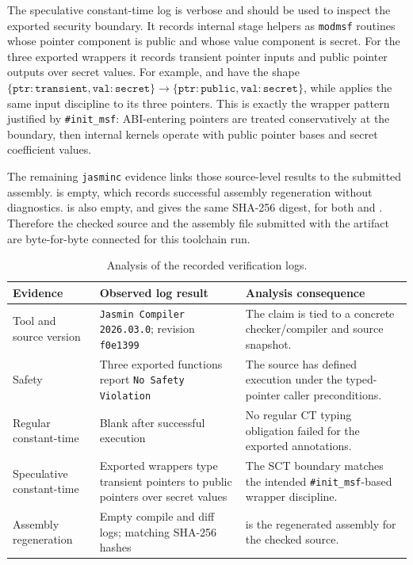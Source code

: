 \documentclass[10pt,twocolumn]{article}
\newcommand{\ct}{constant-time}
\begin{document}
The speculative \ct{} log is verbose and should be used to inspect the exported
security boundary.  It records internal stage helpers as \texttt{modmsf}
routines whose pointer component is public and whose value component is secret.
For the three exported wrappers it records transient pointer inputs and public
pointer outputs over secret values.  For example,  and
 have the shape
\(\{\texttt{ptr}:\texttt{transient},\texttt{val}:\texttt{secret}\}\to
\{\texttt{ptr}:\texttt{public},\texttt{val}:\texttt{secret}\}\), while
 applies the same input discipline to its three
pointers.  This is exactly the wrapper pattern justified by
\texttt{\#init\_msf}: ABI-entering pointers are treated conservatively at the
boundary, then internal kernels operate with public pointer bases and secret
coefficient values.

The remaining \texttt{jasminc} evidence links those source-level results to the
submitted assembly.   is empty, which records
successful assembly regeneration without diagnostics.  
is also empty, and  gives the same SHA-256 digest,
for both  and .  Therefore the checked
source and the assembly file submitted with the artifact are byte-for-byte
connected for this toolchain run.

\begin{table}[t]
\centering
\scriptsize
\setlength{\tabcolsep}{3pt}
\begin{tabular}{P{0.25\columnwidth}P{0.30\columnwidth}P{0.35\columnwidth}}
\toprule
Evidence & Observed log result & Analysis consequence \tabularnewline
\midrule
Tool and source version & \texttt{Jasmin Compiler 2026.03.0}; revision
\texttt{f0e1399} & The claim is tied to a concrete checker/compiler and source
snapshot. \tabularnewline
Safety & Three exported functions report \texttt{No Safety Violation} & The
source has defined execution under the typed-pointer caller preconditions.
\tabularnewline
Regular \ct{} & Blank  after successful execution & No
regular CT typing obligation failed for the exported annotations.
\tabularnewline
Speculative \ct{} & Exported wrappers type transient pointers to public
pointers over secret values & The SCT boundary matches the intended
\texttt{\#init\_msf}-based wrapper discipline. \tabularnewline
Assembly regeneration & Empty compile and diff logs; matching SHA-256 hashes &
 is the regenerated assembly for the checked source.
\tabularnewline
\bottomrule
\end{tabular}
\caption{Analysis of the recorded verification logs.}
\label{tab:results-analysis}
\end{table}
\end{document}
